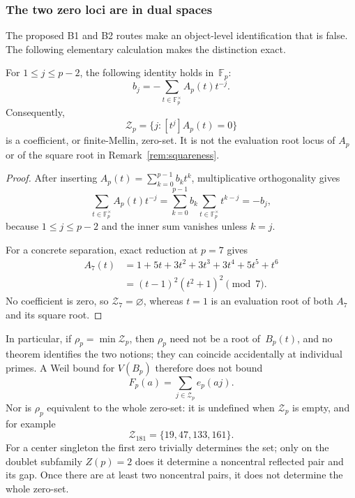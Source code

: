 \subsubsection{The two zero loci are in dual spaces}

The proposed B1 and B2 routes make an object-level identification that is
false.  The following elementary calculation makes the distinction exact.

\begin{proposition}
\label{prop:oracleB-two-zero-loci}
For $1\leq j\leq p-2$, the following identity holds in~$\mathbb F_p$:
\begin{equation}
 b_j=-\sum_{t\in\mathbb F_p^\times}A_p(t)t^{-j}.
 \label{eq:oracleB-mellin}
\end{equation}
Consequently,
\[
 \mathcal Z_p=\{j:[t^j]A_p(t)=0\}
\]
is a coefficient, or finite-Mellin, zero-set.  It is not the evaluation
root locus of $A_p$ or of the square root in
Remark~\ref{rem:squareness}.
\end{proposition}

\begin{proof}
After inserting $A_p(t)=\sum_{k=0}^{p-1}b_kt^k$, multiplicative
orthogonality gives
\[
 \sum_{t\in\mathbb F_p^\times}A_p(t)t^{-j}
 =\sum_{k=0}^{p-1}b_k\sum_{t\in\mathbb F_p^\times}t^{k-j}
 =-b_j,
\]
because $1\leq j\leq p-2$ and the inner sum vanishes unless $k=j$.

For a concrete separation, exact reduction at $p=7$ gives
\begin{align*}
 A_7(t)
 &=1+5t+3t^2+3t^3+3t^4+5t^5+t^6\\
 &=(t-1)^2(t^2+1)^2\pmod7.
\end{align*}
No coefficient is zero, so $\mathcal Z_7=\varnothing$, whereas $t=1$
is an evaluation root of both $A_7$ and its square root.
\end{proof}

In particular, if $\rho_p=\min\mathcal Z_p$, then $\rho_p$ need not be
a root of~$B_p(t)$, and no theorem identifies the two notions; they can
coincide accidentally at individual primes.  A Weil bound for
$V(B_p)$ therefore does not bound
\[
 F_p(a)=\sum_{j\in\mathcal Z_p}e_p(aj).
\]
Nor is $\rho_p$ equivalent to the whole zero-set: it is undefined when
$\mathcal Z_p$ is empty, and for example
\[
 \mathcal Z_{181}=\{19,47,133,161\}.
\]
For a center singleton the first zero trivially determines the set; only on
the doublet subfamily $Z(p)=2$ does it determine a noncentral reflected pair
and its gap.  Once there are at least two noncentral pairs, it does not
determine the whole zero-set.

